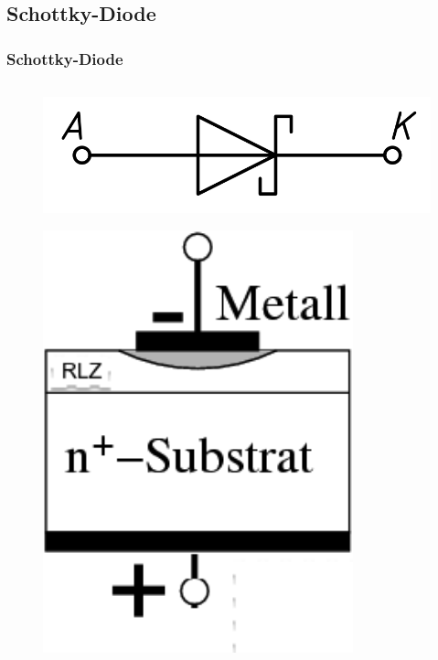 \subsection*{Schottky-Diode}
\begin{frame}
  \frametitle{Schottky-Diode}
  \begin{columns}[c]
    \begin{center}
      \begin{figure}
        \includegraphics[width=1\textwidth,height=.1\textheight,keepaspectratio]{a05/Diode-Schottky-EN_A-K.png}
      \end{figure}
      \begin{figure}
        \includegraphics[width=0.8\textwidth,height=.4\textheight,keepaspectratio]{a05/AusfuerungsformenSchottkyDiode.png}

\end{figure}
\end{center}
\end{columns}
\end{frame}
